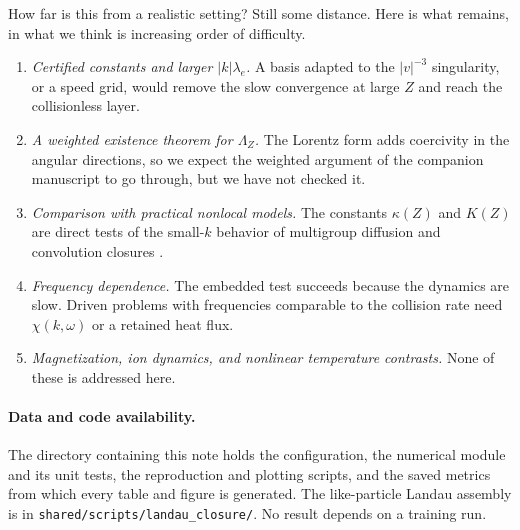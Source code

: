 \documentclass[11pt]{article}
\newcommand{\kap}{\kappa}
\theoremstyle{definition}
\theoremstyle{remark}
\numberwithin{equation}{section}
\begin{document}
How far is this from a realistic setting? Still some distance. Here is
what remains, in what we think is increasing order of difficulty.
\begin{enumerate}
\item \emph{Certified constants and larger $|k|\lambda_e$.} A basis
adapted to the $|v|^{-3}$ singularity, or a speed grid, would remove the
slow convergence at large $Z$ and reach the collisionless layer.
\item \emph{A weighted existence theorem for $\Lambda_Z$.} The Lorentz
form adds coercivity in the angular directions, so we expect the weighted
argument of the companion manuscript to go through, but we have not
checked it.
\item \emph{Comparison with practical nonlocal models.} The constants
$\kap(Z)$ and $K(Z)$ are direct tests of the small-$k$ behavior of
multigroup diffusion and convolution closures
\cite{LMV1983,EpperleinShort1991,Brodrick2017}.
\item \emph{Frequency dependence.} The embedded test succeeds because the
dynamics are slow. Driven problems with frequencies comparable to the
collision rate need $\chi(k,\omega)$ or a retained heat flux.
\item \emph{Magnetization, ion dynamics, and nonlinear temperature
contrasts.} None of these is addressed here.
\end{enumerate}

\paragraph{Data and code availability.}
The directory containing this note holds the configuration, the numerical
module and its unit tests, the reproduction and plotting scripts, and the
saved metrics from which every table and figure is generated. The
like-particle Landau assembly is in
\texttt{shared/scripts/landau\_closure/}. No result depends on a training
run.

\FloatBarrier


\end{document}
